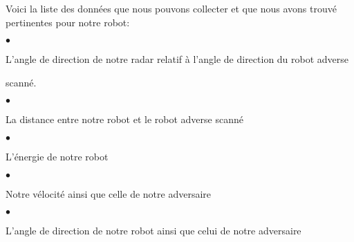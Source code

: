 \documentclass[a4paper,portrait,12pt]{article}
\begin{document}
\begin{flushleft}
Voici la liste des donn\'{e}es que nous pouvons collecter et que nous avons trouv\'{e} pertinentes pour notre robot:
\end{flushleft}


$\bullet$





\begin{flushleft}
L'angle de direction de notre radar relatif \`{a} l'angle de direction du robot adverse
\end{flushleft}





\begin{flushleft}
scann\'{e}.
\end{flushleft}





$\bullet$





\begin{flushleft}
La distance entre notre robot et le robot adverse scann\'{e}
\end{flushleft}





$\bullet$





\begin{flushleft}
L'\'{e}nergie de notre robot
\end{flushleft}





$\bullet$





\begin{flushleft}
Notre v\'{e}locit\'{e} ainsi que celle de notre adversaire
\end{flushleft}





$\bullet$





\begin{flushleft}
L'angle de direction de notre robot ainsi que celui de notre adversaire
\end{flushleft}
\end{document}
